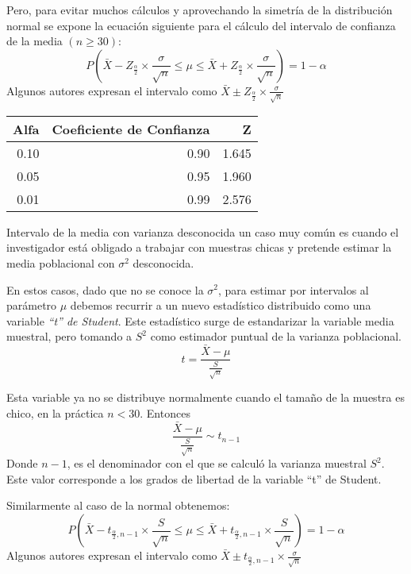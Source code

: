 \documentclass[
  10pt,
  ignorenonframetext,
]{beamer}
\begin{document}
\begin{frame}{}
\protect\hypertarget{section-13}{}
Pero, para evitar muchos cálculos y aprovechando la simetría de la
distribución normal se expone la ecuación siguiente para el cálculo del
intervalo de confianza de la media \((n\ge30)\):
\[ P\left(\bar{X} - Z_\frac{\alpha}{2} \times \frac{\sigma}{\sqrt{n}}  \le \mu \le \bar{X} + Z_\frac{\alpha}{2} \times \frac{\sigma}{\sqrt{n}} \right)=1-\alpha \]
Algunos autores expresan el intervalo como
\(\bar{X} \pm Z_\frac{\alpha}{2} \times \frac{\sigma}{\sqrt{n}}\)

\begin{longtable}[]{@{}rrr@{}}
\toprule()
Alfa & Coeficiente de Confianza & Z \\
\midrule()
\endhead
0.10 & 0.90 & 1.645 \\
0.05 & 0.95 & 1.960 \\
0.01 & 0.99 & 2.576 \\
\bottomrule()
\end{longtable}
\end{frame}

\begin{frame}{Intervalo de la media con varianza desconocida}
\protect\hypertarget{intervalo-de-la-media-con-varianza-desconocida}{}
un caso muy común es cuando el investigador está obligado a trabajar con
muestras chicas y pretende estimar la media poblacional con \(\sigma^2\)
desconocida.

En estos casos, dado que no se conoce la \(\sigma^2\), para estimar por
intervalos al parámetro \(\mu\) debemos recurrir a un nuevo estadístico
distribuido como una variable \emph{``t'' de Student}. Este estadístico
surge de estandarizar la variable media muestral, pero tomando a \(S^2\)
como estimador puntual de la varianza poblacional.
\[t=\frac{\bar{X}-\mu}{\frac{S}{\sqrt{n}}}\]
\end{frame}

\begin{frame}{}
\protect\hypertarget{section-14}{}
Esta variable ya no se distribuye normalmente cuando el tamaño de la
muestra es chico, en la práctica \(n<30\). Entonces
\[\frac{\bar{X}-\mu}{\frac{S}{\sqrt{n}}} \sim t_{n-1}\] Donde \(n-1\),
es el denominador con el que se calculó la varianza muestral \(S^2\).
Este valor corresponde a los grados de libertad de la variable ``t'' de
Student.

Similarmente al caso de la normal obtenemos:
\[ P\left(\bar{X} - t_{\frac{\alpha}{2},n-1} \times \frac{S}{\sqrt{n}}  \le \mu \le \bar{X} + t_{\frac{\alpha}{2},n-1} \times \frac{S}{\sqrt{n}} \right)=1-\alpha \]
Algunos autores expresan el intervalo como
\(\bar{X} \pm t_{\frac{\alpha}{2},n-1} \times \frac{\sigma}{\sqrt{n}}\)
\end{frame}
\end{document}
